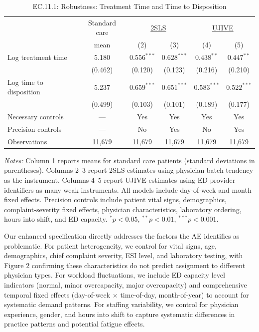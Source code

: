 \documentclass[11pt]{article}
\newcommand{\1}{\hbox{\rm 1\kern-.35em 1}}
\begin{document}
\begin{table}[t!]
\centering
\caption*{EC.11.1: Robustness: Treatment Time and Time to Disposition}
\begin{threeparttable}
\begin{tabular}{lccccc}
\toprule
& Standard care & \multicolumn{2}{c}{\underline{2SLS}} & \multicolumn{2}{c}{\underline{UJIVE}} \\
& mean & (2) & (3) & (4) & (5) \\
\midrule
Log treatment time
& 5.180
& $0.556^{***}$ & $0.628^{***}$
& $0.438^{**}$ & $0.447^{**}$ \\
& (0.462)
& (0.120) & (0.123)
& (0.216) & (0.210) \\[0.75em]

Log time to disposition
& 5.237
& $0.659^{***}$ & $0.651^{***}$
& $0.583^{***}$ & $0.522^{***}$ \\
& (0.499)
& (0.103) & (0.101)
& (0.189) & (0.177) \\[0.5em]

\midrule
Necessary controls & --- & Yes & Yes & Yes & Yes \\
Precision controls & --- & No & Yes & No & Yes \\
Observations & 11{,}679 & 11{,}679 & 11{,}679 & 11{,}679 & 11{,}679 \\
\bottomrule
\end{tabular}

\begin{flushleft}
\footnotesize
\textit{Notes:} Column 1 reports means for standard care patients (standard deviations in parentheses). 
Columns 2–3 report 2SLS estimates using physician batch tendency as the instrument. 
Columns 4–5 report UJIVE estimates using ED provider identifiers as many weak instruments. 
All models include day-of-week and month fixed effects. Precision controls include patient vital signs, demographics, complaint-severity fixed effects, physician characteristics, laboratory ordering, hours into shift, and ED capacity. 
$^{*} p<0.05$, $^{**} p<0.01$, $^{***} p<0.001$.
\end{flushleft}

\end{threeparttable}
\end{table}


Our enhanced specification directly addresses the factors the AE identifies as problematic. For patient heterogeneity, we control for vital signs, age, demographics, chief complaint severity, ESI level, and laboratory testing, with Figure 2 confirming these characteristics do not predict assignment to different physician types. For workload fluctuations, we include ED capacity level indicators (normal, minor overcapacity, major overcapacity) and comprehensive temporal fixed effects (day-of-week $\times$ time-of-day, month-of-year) to account for systematic demand patterns. For staffing variability, we control for physician experience, gender, and hours into shift to capture systematic differences in practice patterns and potential fatigue effects.
\end{document}
